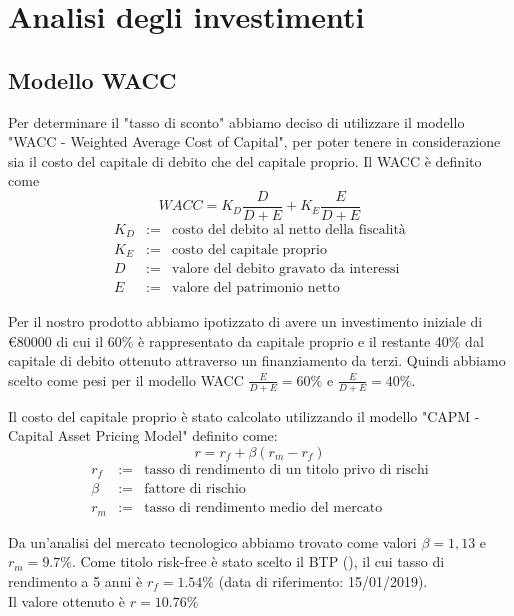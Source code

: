 \section{Analisi degli investimenti}
\subsection{Modello WACC}
Per determinare il "tasso di sconto" abbiamo deciso di utilizzare il modello "WACC - Weighted Average Cost of Capital", per poter tenere in considerazione sia il costo del capitale di debito che del capitale proprio. \newline
Il WACC è definito come
\begin{displaymath}
WACC = K_D \frac{D}{D+E} + K_E \frac{E}{D+E}
\end{displaymath}
\begin{eqnarray*}
K_D &:=& \mbox{costo del debito al netto della fiscalità} \\ 
K_E &:=& \mbox{costo del capitale proprio} \\
D  &:=& \mbox{valore del debito gravato da interessi}\\
E &:=& \mbox{valore del patrimonio netto}
\end{eqnarray*}

Per il nostro prodotto abbiamo ipotizzato di avere un investimento iniziale di \euro 80000 di cui il 60\% è rappresentato da capitale proprio e il restante 40\% dal capitale di debito ottenuto attraverso un finanziamento da terzi. Quindi abbiamo scelto come pesi per il modello WACC $\frac{E}{D+E}=60\%$ e $\frac{E}{D+E} = 40\%$.

Il costo del capitale proprio è stato calcolato utilizzando il modello "CAPM - Capital Asset Pricing Model" definito come:
\begin{displaymath}
r = r_f + \beta (r_m - r_f )
\end{displaymath}
\begin{eqnarray*}
	r_f &:=& \mbox{tasso di rendimento di un titolo privo di rischi} \\ 
	\beta &:=& \mbox{fattore di rischio} \\
	r_m &:=& \mbox{tasso di rendimento medio del mercato}
\end{eqnarray*}

Da un’analisi del mercato tecnologico abbiamo trovato come valori
$\beta=1,13$ e $r_m=9.7\%$. Come titolo risk-free è stato scelto il BTP
(\cite{finmer}), il cui tasso di rendimento a 5 anni è $r_f=1.54\%$ (data di
riferimento: 15/01/2019).\\ 
Il valore ottenuto è $r = 10.76\%$\\

